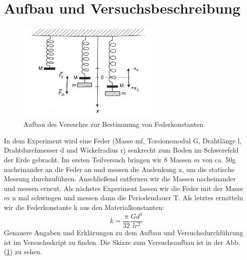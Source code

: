 \documentclass[bibliography=totocnumbered]{scrartcl}
\begin{document}
	\section{Aufbau und Versuchsbeschreibung}
	\begin{figure}[H]
	    \centering									
		\includegraphics[width=200pt]{fotos/gpr1/VAufbau.pdf}			
		\caption{Aufbau des Versuches zur Bestimmung von Federkonstanten}						
		\label{Abb: Versuchsaufbau}	
	\end{figure}
	
	In dem Experiment wird eine Feder (Masse mf, Torsionsmodul G, Drahtlänge l,
	Drahtdurchmesser d und Wickelradius r) senkrecht zum Boden im Schwerefeld der Erde
	gebracht.
	Im ersten Teilversuch bringen wir 8 Massen $ m $ von ca. 50g nacheinander an die Feder an
	und messen die Auslenkung x, um die statische Messung durchzuführen. Anschließend
	entfernen wir die Massen nacheinander und messen erneut.
	Als nächstes Experiment lassen wir die Feder mit der Masse $ m $ n mal schwingen und
	messen dann die Periodendauer T.
	Als letztes ermitteln wir die Federkonstante k aus den Materialkonstanten:
	\begin{equation}\label{eq: Materialkonstanten}
		k=\dfrac{\pi}{32}\dfrac{G d^{4}}{l r^{2}}
	\end{equation}
	Genauere Angaben und Erklärungen zu dem Aufbau und Versuchsdurchführung ist im
	Versuchsskript\smartcite{Muller.b} zu finden. Die Skizze zum Versuchsaufbau ist in der Abb. (\ref{Abb: Versuchsaufbau}) zu sehen.
	
	\newpage
\end{document}
